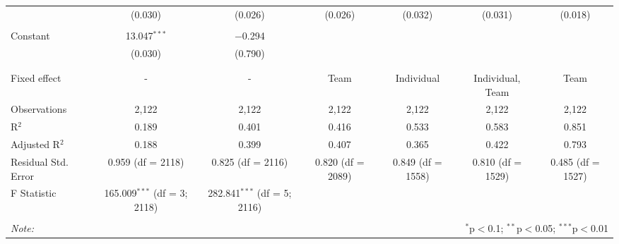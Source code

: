 \begin{table}[!htbp]
\begin{tabular}{@{\extracolsep{5pt}}lcccccc}
  & (0.030) & (0.026) & (0.026) & (0.032) & (0.031) & (0.018) \\
  & & & & & & \\
 Constant & 13.047$^{***}$ & $-$0.294 &  &  &  &  \\
  & (0.030) & (0.790) &  &  &  &  \\
  & & & & & & \\
\hline \\[-1.8ex]
Fixed effect & - & - & Team & Individual & Individual, Team & Team \\
Observations & 2,122 & 2,122 & 2,122 & 2,122 & 2,122 & 2,122 \\
R$^{2}$ & 0.189 & 0.401 & 0.416 & 0.533 & 0.583 & 0.851 \\
Adjusted R$^{2}$ & 0.188 & 0.399 & 0.407 & 0.365 & 0.422 & 0.793 \\
Residual Std. Error & 0.959 (df = 2118) & 0.825 (df = 2116) & 0.820 (df = 2089) & 0.849 (df = 1558) & 0.810 (df = 1529) & 0.485 (df = 1527) \\
F Statistic & 165.009$^{***}$ (df = 3; 2118) & 282.841$^{***}$ (df = 5; 2116) &  &  &  &  \\
\hline
\hline \\[-1.8ex]
\textit{Note:}  & \multicolumn{6}{r}{$^{*}$p$<$0.1; $^{**}$p$<$0.05; $^{***}$p$<$0.01} \\
\end{tabular}
\end{table}
